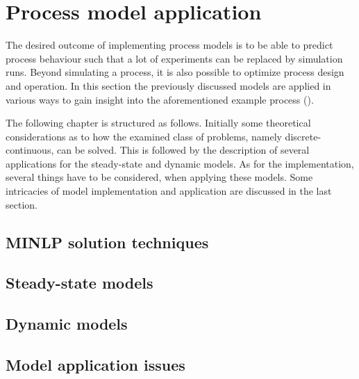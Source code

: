 \chapter{Process model application}
\label{chp:processmodelapp}
The desired outcome of implementing process models is to be able to predict process behaviour 
such that a lot of experiments can be replaced by simulation runs. Beyond simulating a process, 
it is also possible to optimize process design and operation. In this section the 
previously discussed models are applied in various ways to gain insight into the
aforementioned example process ().

The following chapter is structured as follows. Initially some theoretical considerations 
as to how the examined class of problems, namely discrete-continuous, can be solved. 
This is followed by the description of several applications for the steady-state and dynamic models.
As for the implementation, several things have to be considered, when applying these models. 
Some intricacies of model implementation and application are discussed in the last section.   


    \section{MINLP solution techniques}
        

    \section{Steady-state models}
        

    \section{Dynamic models}
        

    \section{Model application issues}
        
